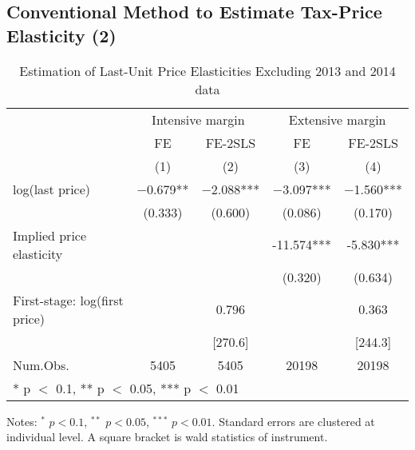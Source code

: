 \documentclass[
  11pt,
  a4paper,
]{article}
\begin{document}
\hypertarget{conventional-method-to-estimate-tax-price-elasticity-2}{%
\subsection{Conventional Method to Estimate Tax-Price Elasticity (2)}\label{conventional-method-to-estimate-tax-price-elasticity-2}}

\begin{table}

\caption{\label{tab:WoAnnoucementElasticity}Estimation of Last-Unit Price Elasticities Excluding 2013 and 2014 data}
\centering
\fontsize{7}{9}\selectfont
\begin{threeparttable}
\begin{tabular}[t]{lcccc}
\toprule
\multicolumn{1}{c}{ } & \multicolumn{2}{c}{Intensive margin} & \multicolumn{2}{c}{Extensive margin} \\
\cmidrule(l{3pt}r{3pt}){2-3} \cmidrule(l{3pt}r{3pt}){4-5}
\multicolumn{1}{c}{ } & \multicolumn{1}{c}{FE} & \multicolumn{1}{c}{FE-2SLS} & \multicolumn{1}{c}{FE} & \multicolumn{1}{c}{FE-2SLS} \\
\cmidrule(l{3pt}r{3pt}){2-2} \cmidrule(l{3pt}r{3pt}){3-3} \cmidrule(l{3pt}r{3pt}){4-4} \cmidrule(l{3pt}r{3pt}){5-5}
  & (1) & (2) & (3) & (4)\\
\midrule
log(last price) & \num{-0.679}** & \num{-2.088}*** & \num{-3.097}*** & \num{-1.560}***\\
 & (\num{0.333}) & (\num{0.600}) & (\num{0.086}) & (\num{0.170})\\
\midrule
Implied price elasticity &  &  & -11.574*** & -5.830***\\
 &  &  & (0.320) & (0.634)\\
First-stage: log(first price) &  & 0.796 &  & 0.363\\
 &  & {}[270.6] &  & {}[244.3]\\
Num.Obs. & \num{5405} & \num{5405} & \num{20198} & \num{20198}\\
\bottomrule
\multicolumn{5}{l}{\rule{0pt}{1em}* p $<$ 0.1, ** p $<$ 0.05, *** p $<$ 0.01}\\
\end{tabular}
\begin{tablenotes}
\item Notes: $^{*}$ $p < 0.1$, $^{**}$ $p < 0.05$, $^{***}$ $p < 0.01$. Standard errors are clustered at individual level. A square bracket is wald statistics of instrument.
\end{tablenotes}
\end{threeparttable}
\end{table}
\end{document}
